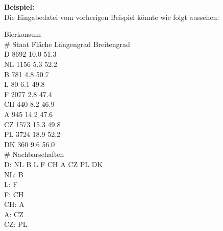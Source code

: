 \documentclass[a4paper,11pt]{article}
\newcommand*{\mybox}[2]{\colorbox{#1!30}{\parbox{.98\linewidth}{#2}}}
\begin{document}
{\textbf{Beispiel:}\\
Die Eingabedatei vom vorherigen Beispiel k\"onnte wie folgt aussehen:\\
\vspace{5mm}
\mybox{background}{
Bierkonsum\\
\# Staat Fläche Längengrad Breitengrad\\
D 8692 10.0 51.3\\
NL 1156 5.3 52.2\\
B 781 4.8 50.7\\
L 80 6.1 49.8\\
F 2077 2.8 47.4\\
CH 440 8.2 46.9\\
A 945 14.2 47.6\\
CZ 1573 15.3 49.8\\
PL 3724 18.9 52.2\\
DK 360 9.6 56.0\\
\# Nachbarschaften\\
D: NL B L F CH A CZ PL DK\\
NL: B\\
L: F\\
F: CH\\
CH: A\\
A: CZ\\
CZ: PL
}
}
\end{document}
